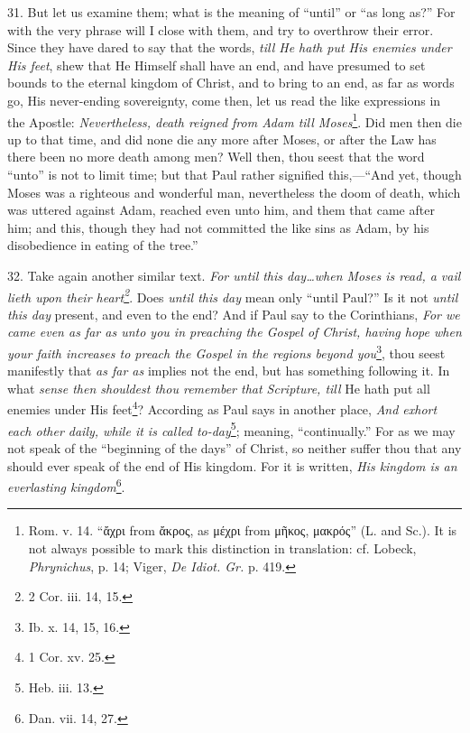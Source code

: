 31. But let us examine them; what is the meaning of “until” or “as long as?” For with the very phrase will I close with them, and try to overthrow their error. Since they have dared to say that the words, \emph{till He hath put His enemies under His feet}, shew that He Himself shall have an end, and have presumed to set bounds to the eternal kingdom of Christ, and to bring to an end, as far as words go, His never-ending sovereignty, come then, let us read the like expressions in the Apostle: \emph{Nevertheless, death reigned from Adam till Moses}\footnote{Rom. v. 14. “\textgreek{ἄχρι} from \textgreek{ἄκρος}, as \textgreek{μέχρι} from \textgreek{μῆκος, μακρός}” (L. and Sc.). It is not always possible to mark this distinction in translation: cf. Lobeck, \emph{Phrynichus}, p. 14; Viger, \emph{De Idiot. Gr.} p. 419.}. Did men then die up to that time, and did none die any more after Moses, or after the Law has there been no more death among men? Well then, thou seest that the word “unto” is not to limit time; but that Paul rather signified this,—“And yet, though Moses was a righteous and wonderful man, nevertheless the doom of death, which was uttered against Adam, reached even unto him, and them that came after him; and this, though they had not committed the like sins as Adam, by his disobedience in eating of the tree.”

32. Take again another similar text. \emph{For until this day…when Moses is read, a vail lieth upon their heart\footnote{2 Cor. iii. 14, 15.}}. Does \emph{until this day} mean only “until Paul?” Is it not \emph{until this day} present, and even to the end? And if Paul say to the Corinthians, \emph{For we came even as far as unto you in preaching the Gospel of Christ, having hope when your faith increases to preach the Gospel in the regions beyond you}\footnote{Ib. x. 14, 15, 16.}, thou seest manifestly that \emph{as far as} implies not the end, but has something following it. In what \emph{sense then shouldest thou remember that Scripture, till} He hath put all enemies under His feet\footnote{1 Cor. xv. 25.}? According as Paul says in another place, \emph{And exhort each other daily, while it is called to-day}\footnote{Heb. iii. 13.}; meaning, “continually.” For as we may not speak of the “beginning of the days” of Christ, so neither suffer thou that any should ever speak of the end of His kingdom. For it is written, \emph{His kingdom is an everlasting kingdom}\footnote{Dan. vii. 14, 27.}.

